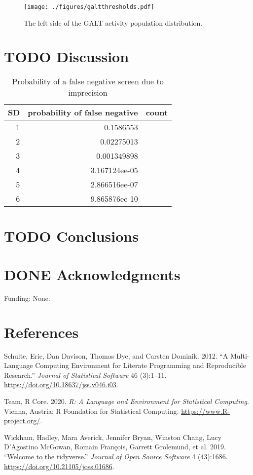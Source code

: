 \documentclass[review]{elsarticle}
\begin{document}
\begin{figure}[htbp]
\centering
\texttt{[image: ./figures/galtthresholds.pdf]}
\caption{\label{fig:org34c08a4}The left side of the GALT activity population distribution.}
\end{figure}

\section*{{\bfseries\sffamily TODO} Discussion}
\label{sec:org7e2fc84}
\begin{table}[htbp]
\caption[sigma]{\label{tab:orga20f5eb}Probability of a false negative screen due to imprecision}
\centering
\begin{tabular}{rrl}
SD & probability of false negative & count\\
\hline
1 & 0.1586553\\
2 & 0.02275013\\
3 & 0.001349898\\
4 & 3.167124ee-05\\
5 & 2.866516ee-07\\
6 & 9.865876ee-10\\
\end{tabular}
\end{table}


\section*{{\bfseries\sffamily TODO} Conclusions}
\label{sec:orgfbe9f78}

\section*{{\bfseries\sffamily DONE} Acknowledgments}
\label{sec:org3cb0f41}
Funding: None.
\section*{References}
\label{sec:org7da03af}
\begin{hangparas}{1.5em}{1}
\hypertarget{citeproc_bib_item_1}{Schulte, Eric, Dan Davison, Thomas Dye, and Carsten Dominik. 2012. “A Multi-Language Computing Environment for Literate Programming and Reproducible Research.” \textit{Journal of Statistical Software} 46 (3):1–11. \href{https://doi.org/10.18637/jss.v046.i03}{https://doi.org/10.18637/jss.v046.i03}.}

\hypertarget{citeproc_bib_item_2}{Team, R Core. 2020. \textit{R: A Language and Environment for Statistical Computing}. Vienna, Austria: R Foundation for Statistical Computing. \href{https://www.R-project.org/}{https://www.R-project.org/}.}

\hypertarget{citeproc_bib_item_3}{Wickham, Hadley, Mara Averick, Jennifer Bryan, Winston Chang, Lucy D’Agostino McGowan, Romain François, Garrett Grolemund, et al. 2019. “Welcome to the tidyverse.” \textit{Journal of Open Source Software} 4 (43):1686. \href{https://doi.org/10.21105/joss.01686}{https://doi.org/10.21105/joss.01686}.}
\end{hangparas}
\end{document}
